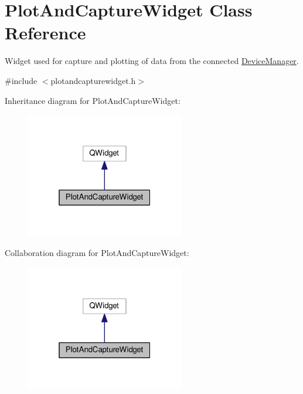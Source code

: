 \hypertarget{classPlotAndCaptureWidget}{}\section{Plot\+And\+Capture\+Widget Class Reference}
\label{classPlotAndCaptureWidget}


Widget used for capture and plotting of data from the connected \hyperlink{classDeviceManager}{Device\+Manager}.  




{\ttfamily \#include $<$plotandcapturewidget.\+h$>$}



Inheritance diagram for Plot\+And\+Capture\+Widget\+:
\nopagebreak
\begin{figure}[H]
\begin{center}
\leavevmode
\includegraphics[width=196pt]{classPlotAndCaptureWidget__inherit__graph}
\end{center}
\end{figure}


Collaboration diagram for Plot\+And\+Capture\+Widget\+:
\nopagebreak
\begin{figure}[H]
\begin{center}
\leavevmode
\includegraphics[width=196pt]{classPlotAndCaptureWidget__coll__graph}
\end{center}
\end{figure}
